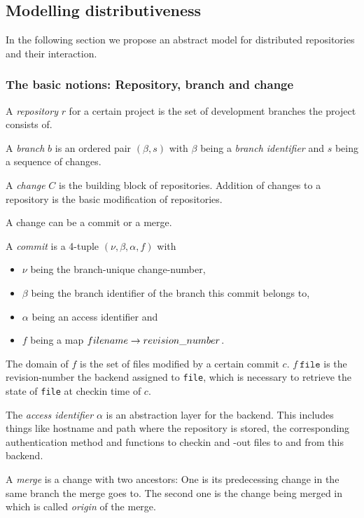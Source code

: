 \documentclass[fleqn, 10pt, a4paper]{report} \usepackage{amssymb}
\begin{document}
\subsection{Modelling distributiveness}

In the following section we propose an abstract model for distributed
repositories and their interaction.

\subsubsection{The basic notions: Repository, branch and change}

A \emph{repository} $r$ for a certain project is the set of
development branches the project consists of.

A \emph{branch} $b$ is an ordered pair $(\beta, s)$ with $\beta$ being
a \emph{branch identifier} and $s$ being a sequence of changes.

A \emph{change} $C$ is the building block of repositories. Addition
of changes to a repository is the basic modification of repositories.

A change can be a commit or a merge.

A \emph{commit} is a 4-tuple $(\nu, \beta, \alpha, f)$ with
\begin{itemize}
\item $\nu$ being the branch-unique change-number,
\item $\beta$ being the branch identifier of the branch this commit
  belongs to,
\item $\alpha$ being an access identifier and
\item $f$ being a map $\mathnormal{filename} \rightarrow
  \mathnormal{revision\_number}$.
\end{itemize}

The domain of $f$ is the set of files modified by a certain commit
$c$. $f\ \mathtt{file}$ is the revision-number the backend assigned to
\texttt{file}, which is necessary to retrieve the state of
\texttt{file} at checkin time of $c$.

The \emph{access identifier} $\alpha$ is an abstraction layer for the
backend. This includes things like hostname and path where the
repository is stored, the corresponding authentication method and
functions to checkin and -out files to and from this backend.

A \emph{merge} is a change with two ancestors: One is its predecessing
change in the same branch the merge goes to. The second one is the
change being merged in which is called \emph{origin} of the merge.
\end{document}

